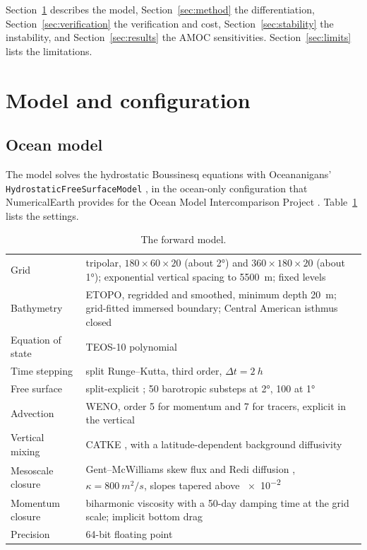 \documentclass[11pt]{article}
\begin{document}
Section~\ref{sec:model} describes the model, Section~\ref{sec:method} the differentiation,
Section~\ref{sec:verification} the verification and cost, Section~\ref{sec:stability} the instability, and
Section~\ref{sec:results} the AMOC sensitivities. Section~\ref{sec:limits} lists the limitations.

\section{Model and configuration}
\label{sec:model}

\subsection{Ocean model}

The model solves the hydrostatic Boussinesq equations with Oceananigans' \texttt{HydrostaticFreeSurfaceModel}
\citep{silvestri2025}, in the ocean-only configuration that NumericalEarth provides for the Ocean Model
Intercomparison Project \citep[OMIP;][]{griffies2016}. Table~\ref{tab:model} lists the settings.

\begin{table}[ht]
\centering\small
\begin{tabular}{@{}lp{}@{}}
\toprule
Grid & tripolar, $180\times60\times20$ (about \ang{2}) and $360\times180\times20$ (about \ang{1}); exponential
       vertical spacing to \SI{5500}{m}; fixed levels \\
Bathymetry & ETOPO, regridded and smoothed, minimum depth \SI{20}{m}; grid-fitted immersed boundary; Central
             American isthmus closed \\
Equation of state & TEOS-10 polynomial \citep{roquet2015} \\
Time stepping & split Runge--Kutta, third order, $\Delta t = \SI{2}{h}$ \\
Free surface & split-explicit \citep{shchepetkin2005}; 50 barotropic substeps at \ang{2}, 100 at \ang{1} \\
Advection & WENO, order 5 for momentum and 7 for tracers, explicit in the vertical \\
Vertical mixing & CATKE \citep{wagner2025catke}, with a latitude-dependent background diffusivity \\
Mesoscale closure & Gent--McWilliams skew flux and Redi diffusion \citep{gent1990, redi1982, griffies1998},
                    $\kappa = \SI{800}{m^2/s}$, slopes tapered above \num{e-2} \citep{danabasoglu1995} \\
Momentum closure & biharmonic viscosity with a 50-day damping time at the grid scale; implicit bottom drag \\
Precision & 64-bit floating point \\
\bottomrule
\end{tabular}
\caption{The forward model.}
\label{tab:model}
\end{table}
\end{document}

